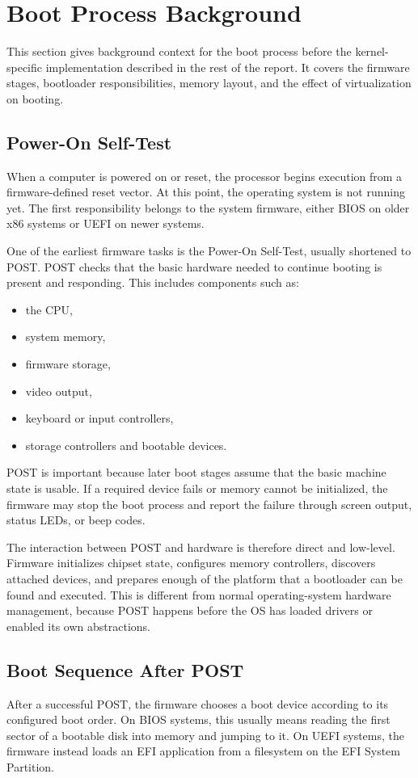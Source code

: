 \section{Boot Process Background}

This section gives background context for the boot process before the kernel-specific implementation described in the rest of the report. It covers the firmware stages, bootloader responsibilities, memory layout, and the effect of virtualization on booting.

\subsection{Power-On Self-Test}
When a computer is powered on or reset, the processor begins execution from a firmware-defined reset vector. At this point, the operating system is not running yet. The first responsibility belongs to the system firmware, either BIOS on older x86 systems or UEFI on newer systems.

One of the earliest firmware tasks is the Power-On Self-Test, usually shortened to POST. POST checks that the basic hardware needed to continue booting is present and responding. This includes components such as:
\begin{itemize}
  \item the CPU,
  \item system memory,
  \item firmware storage,
  \item video output,
  \item keyboard or input controllers,
  \item storage controllers and bootable devices.
\end{itemize}

POST is important because later boot stages assume that the basic machine state is usable. If a required device fails or memory cannot be initialized, the firmware may stop the boot process and report the failure through screen output, status LEDs, or beep codes.

The interaction between POST and hardware is therefore direct and low-level. Firmware initializes chipset state, configures memory controllers, discovers attached devices, and prepares enough of the platform that a bootloader can be found and executed. This is different from normal operating-system hardware management, because POST happens before the OS has loaded drivers or enabled its own abstractions.

\subsection{Boot Sequence After POST}
After a successful POST, the firmware chooses a boot device according to its configured boot order. On BIOS systems, this usually means reading the first sector of a bootable disk into memory and jumping to it. On UEFI systems, the firmware instead loads an EFI application from a filesystem on the EFI System Partition.

